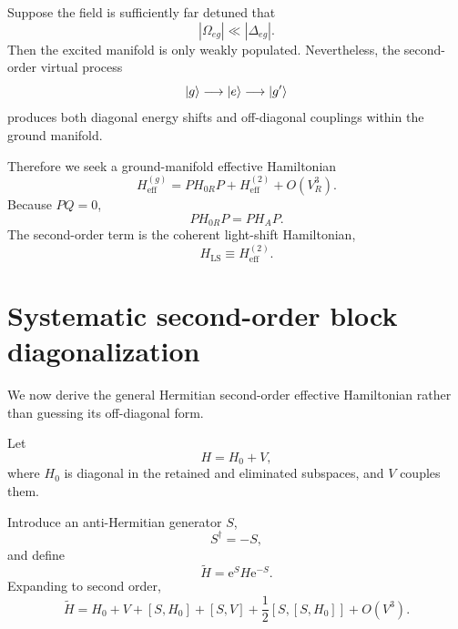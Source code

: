 \documentclass[11pt]{article}
\newcommand{\ee}{\mathrm{e}}
\newcommand{\HLS}{H_{\mathrm{LS}}}
\newcommand{\Heff}{H_{\mathrm{eff}}}
\newcommand{\Hatom}{H_A}
\newcommand{\VR}{V_R}
\newcommand{\projG}{P}
\newcommand{\projE}{Q}
\begin{document}
Suppose the field is sufficiently far detuned that
\begin{equation}
|\Omega_{eg}|\ll |\Delta_{eg}|.
\label{eq:dispersivecondition}
\end{equation}
Then the excited manifold is only weakly populated. Nevertheless, the second-order virtual process
\begin{equation}
\ket{g}
\longrightarrow
\ket{e}
\longrightarrow
\ket{g'}
\label{eq:virtual}
\end{equation}
produces both diagonal energy shifts and off-diagonal couplings within the ground manifold.

Therefore we seek a ground-manifold effective Hamiltonian
\begin{equation}
\Heff^{(g)}
=
\projG H_{0R}\projG
+
H_{\mathrm{eff}}^{(2)}
+
O(\VR^3).
\label{eq:Heffg}
\end{equation}
Because $\projG\projE=0$,
\begin{equation}
\projG H_{0R}\projG
=
\projG\Hatom\projG.
\label{eq:PH0P}
\end{equation}
The second-order term is the coherent light-shift Hamiltonian,
\begin{equation}
\HLS\equiv H_{\mathrm{eff}}^{(2)}.
\label{eq:HLSdef}
\end{equation}

\section{Systematic second-order block diagonalization}

We now derive the general Hermitian second-order effective Hamiltonian rather than guessing its off-diagonal form.

Let
\begin{equation}
H=H_0+V,
\label{eq:Hgeneric}
\end{equation}
where $H_0$ is diagonal in the retained and eliminated subspaces, and $V$ couples them.

Introduce an anti-Hermitian generator $S$,
\begin{equation}
S^\dagger=-S,
\label{eq:Santi}
\end{equation}
and define
\begin{equation}
\widetilde H
=\ee^S H\ee^{-S}.
\label{eq:Htilde}
\end{equation}
Expanding to second order,
\begin{equation}
\widetilde H
=
H_0+V+[S,H_0]+[S,V]
+\frac{1}{2}[S,[S,H_0]]
+O(V^3).
\label{eq:BCH}
\end{equation}
\end{document}
